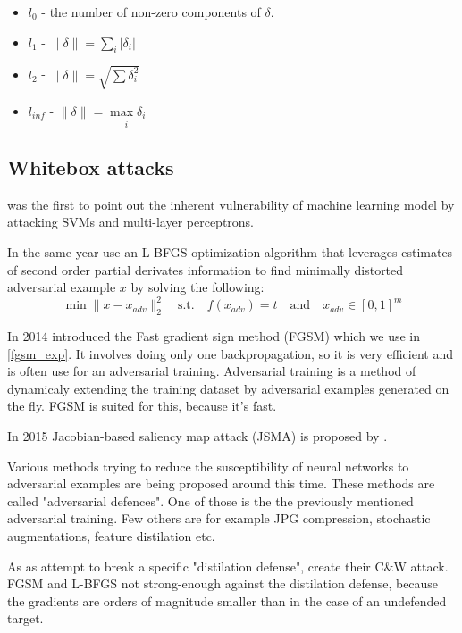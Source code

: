 \begin{itemize}
    \item $l_{0}$ - the number of non-zero components of $\delta$.
    \item $l_{1}$ - $\lVert \delta \rVert = \underset{i}{\sum} \lvert \delta_{i} \rvert$
    \item $l_{2}$ - $\lVert \delta \rVert = \sqrt{\sum \delta_{i}^2}$
    \item $l_{inf}$ - $\lVert \delta \rVert = \underset{i}{\max \delta_{i}}$
\end{itemize}



\subsection{Whitebox attacks}

\cite{Biggio2013EvasionAA} was the first to point out the inherent vulnerability of machine learning model by attacking SVMs and multi-layer perceptrons.


In the same year \cite{szegedy2014intriguing} use an L-BFGS optimization algorithm that leverages estimates of second order partial derivates information to find minimally distorted adversarial example $x$ by solving the following:
$$\min \lVert x - x_{adv} \rVert_2^2 \quad \text{s.t.} \quad f(x_{adv}) = t \quad \text{and} \quad x_{adv} \in [0, 1]^m$$


In 2014 \cite{goodfellow2015explaining} introduced the Fast gradient sign method (FGSM) which we use in \ref{fgsm_exp}. It involves doing only one backpropagation, so it is very efficient and is often use for an adversarial training. Adversarial training is a method of dynamicaly extending the training dataset by adversarial examples generated on the fly. FGSM is suited for this, because it's fast.

In 2015 Jacobian-based saliency map attack (JSMA) is proposed by \cite{papernot2015limitations}.

Various methods trying to reduce the susceptibility of neural networks to adversarial examples are being proposed around this time. These methods are called "adversarial defences". One of those is the the previously mentioned adversarial training. Few others are for example JPG compression, stochastic augmentations, feature distilation etc.

As as attempt to break a specific "distilation defense", \cite{carlini2017evaluating} create their C\&W attack. FGSM and L-BFGS not strong-enough against the distilation defense, because the gradients are orders of magnitude smaller than in the case of an undefended target.

